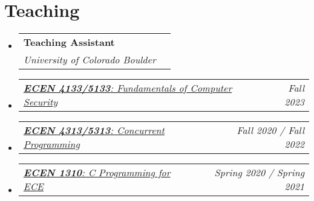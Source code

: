 \documentclass[letterpaper,11pt]{article}
\makeatletter
\newcommand{\resumeSubheading}[4]{
  \vspace{-2pt}\item
    \begin{tabular*}{0.97\textwidth}[t]{l@{\extracolsep{\fill}}r}
      \textbf{#1} & #2 \\
      \textit{\small#3} & \textit{\small #4} \\
    \end{tabular*}\vspace{-7pt}
}
\newcommand{\resumeSubSubheading}[2]{
    \item
    \begin{tabular*}{0.97\textwidth}{l@{\extracolsep{\fill}}r}
      \textit{\small#1} & \textit{\small #2} \\
    \end{tabular*}\vspace{-7pt}
}
\newcommand{\resumeSubHeadingListStart}{\begin{itemize}[leftmargin=0.15in, label={}]}
\newcommand{\resumeSubHeadingListEnd}{\end{itemize}}
\makeatother
\begin{document}
\vspace{1pt}

\section{Teaching}
\resumeSubHeadingListStart
\resumeSubheading
{Teaching Assistant}{}
{University of Colorado Boulder}{}
\resumeSubSubheading
{
  \em\href{https://experts.colorado.edu/display/coursename_ECEN-5133}{\textbf{ECEN 4133/5133}: Fundamentals of Computer Security}
}{Fall 2023}
\resumeSubSubheading
{
  \em\href{https://experts.colorado.edu/display/coursename_ECEN-5313}{\textbf{ECEN 4313/5313}: Concurrent Programming}
}{Fall 2020 / Fall 2022}
\resumeSubSubheading
{
  \em\href{https://experts.colorado.edu/display/coursename_ECEN-1310}{\textbf{ECEN 1310}: C Programming for ECE}
}{Spring 2020 / Spring 2021}
\resumeSubHeadingListEnd
\vspace{1pt}
\end{document}
